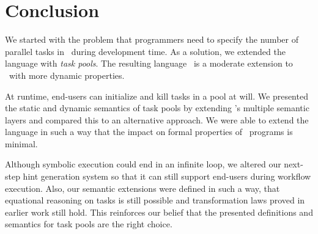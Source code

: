 
\section{Conclusion}
\label{sec:conclusion}

We started with the problem that programmers need to specify the number of parallel tasks in \TOPHAT\ during development time.
As a solution, we extended the language with \emph{task pools}.
The resulting language \DYNTOPHAT\ is a moderate extension to \TOPHAT\ with more dynamic properties.

At runtime, end-users can initialize and kill tasks in a pool at will.
We presented the static and dynamic semantics of task pools by extending \TOPHAT's multiple semantic layers
and compared this to an alternative approach.
We were able to extend the language in such a way that the impact on formal properties of \TOPHAT\ programs is minimal.

Although symbolic execution could end in an infinite loop,
we altered our next-step hint generation system so that it can still support end-users during workflow execution.
Also, our semantic extensions were defined in such a way, that equational reasoning on tasks is still possible
and transformation laws proved in earlier work still hold.
This reinforces our belief that the presented definitions and semantics for task pools are the right choice.
